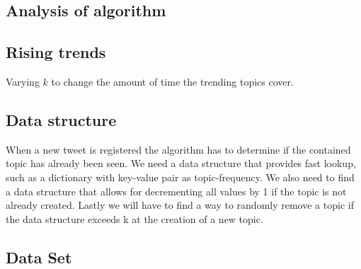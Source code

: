 \subsection{Analysis of algorithm}

\subsection{Rising trends}
Varying $k$ to change the amount of time the trending topics cover.

\subsection{Data structure}
When a new tweet is registered the algorithm has to determine if the contained topic has already been seen. We need a data structure that provides fast lookup, such as a dictionary with key-value pair as topic-frequency. We also need to find a data structure that allows for decrementing all values by 1 if the topic is not already created. Lastly we will have to find a way to randomly remove a topic if the data structure exceeds k at the creation of a new topic.

\subsection{Data Set}